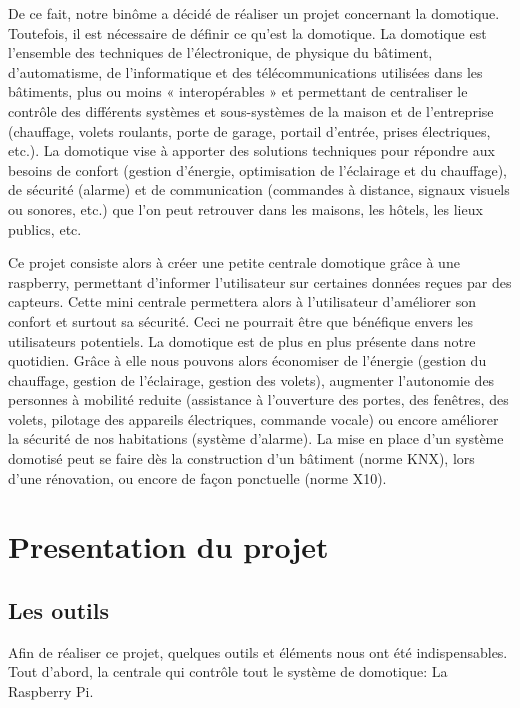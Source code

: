 De ce fait, notre binôme a décidé de réaliser un projet concernant la domotique. Toutefois, il est nécessaire de définir ce qu'est la domotique. La domotique est l'ensemble des techniques de l'électronique, de physique du bâtiment, d'automatisme, de l'informatique et des télécommunications utilisées dans les bâtiments, plus ou moins « interopérables » et permettant de centraliser le contrôle des différents systèmes et sous-systèmes de la maison et de l'entreprise (chauffage, volets roulants, porte de garage, 
portail d'entrée, prises électriques, etc.). La domotique vise à apporter des solutions techniques pour répondre aux besoins de 
confort (gestion d'énergie, optimisation de l'éclairage et du chauffage), de sécurité (alarme) et de communication (commandes à 
distance, signaux visuels ou sonores, etc.) que l'on peut retrouver dans les maisons, les hôtels, les lieux publics, etc.


Ce projet consiste alors à créer une petite centrale domotique grâce à une raspberry, permettant d'informer l'utilisateur sur certaines données reçues par des capteurs. Cette mini centrale permettera alors à l'utilisateur d'améliorer son confort et surtout sa sécurité. Ceci ne pourrait être que bénéfique envers les utilisateurs potentiels. La domotique est de plus en plus présente dans notre quotidien. Grâce à elle nous pouvons alors économiser de l'énergie (gestion du chauffage, gestion de l'éclairage, gestion des volets), augmenter l'autonomie des personnes à mobilité reduite (assistance à l'ouverture des portes, des fenêtres, des volets, pilotage des appareils électriques, commande vocale) ou encore améliorer la sécurité de nos habitations (système d'alarme). La mise en place d'un système domotisé peut se faire dès la construction d'un bâtiment (norme KNX), lors d'une rénovation, ou encore de façon ponctuelle (norme X10).





\newpage
\chapter{Presentation du projet}
\section{Les outils} 
Afin de réaliser ce projet, quelques outils et éléments nous ont été indispensables. Tout d'abord, la centrale qui contrôle tout le système de domotique: La Raspberry Pi.

